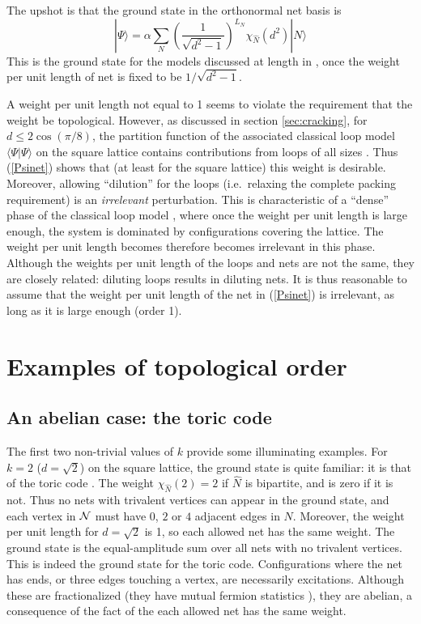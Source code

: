 \documentclass[11pt]{article}
\begin{document}
The upshot is that the ground state in the orthonormal net basis is
\begin{equation}
|\Psi\rangle = \alpha\sum_{N}
 \left(\frac{1}{\sqrt{d^2-1}}\right)^{L_N} \chi_{\widehat{N}}(d^2)|N\rangle
\label{Psinet}
\end{equation}
This is the ground state for the models discussed at length
in \cite{FF}, once the weight per unit length of net is fixed to be
$1/\sqrt{d^2-1}$. 

A weight per unit length not equal to 1 seems to violate the
requirement that the weight be topological.  However, as discussed in
section \ref{sec:cracking}, for $d\le 2\cos(\pi/8)$, the partition function
of the associated classical loop model $\langle \Psi | \Psi\rangle$ on
the square lattice contains contributions from loops of all sizes
\cite{FJ}. Thus (\ref{Psinet}) shows that (at least for the square
lattice) this weight is desirable. Moreover, allowing ``dilution'' for
the loops (i.e.\ relaxing the complete packing requirement)
is an {\em irrelevant} perturbation. This is characteristic of a
``dense'' phase of the classical loop model \cite{Nienhuis}, where
once the weight per unit length is large enough, the system is
dominated by configurations covering the lattice. The weight per unit
length becomes therefore becomes irrelevant in this phase. Although
the weights per unit length of the loops and nets are not the same,
they are closely related: diluting loops results in diluting nets. 
It is thus reasonable to assume that the weight
per unit length of the net in (\ref{Psinet}) is irrelevant, as long as
it is large enough (order 1). 


\section{Examples of topological order}
\label{sec:examples}

\subsection{An abelian case: the toric code}

The first two non-trivial values of $k$ provide some illuminating
examples. For $k=2$ ($d=\sqrt{2}$) on the square lattice, the ground
state is quite familiar: it is that of the toric code
\cite{Kitaev97}. The weight $\chi_{\widehat{N}}(2)=2$ if $\widehat{N}$
is bipartite, and is zero if it is not. Thus no nets
with trivalent vertices can appear in the ground state, and each
vertex in ${\cal N}$ must have $0$, $2$ or $4$ adjacent edges in
$N$. Moreover, the weight per unit length for $d=\sqrt{2}$ is 1, so
each allowed net has the same weight. The ground state is the
equal-amplitude sum over all nets with no trivalent vertices. This is
indeed the ground state for the toric code. 
Configurations where the net has ends, or three edges touching a
vertex, are necessarily excitations. Although these are fractionalized
(they have mutual fermion statistics \cite{Kitaev97}), they are
abelian, a consequence of the fact of the each allowed net has the
same weight.
\end{document}

